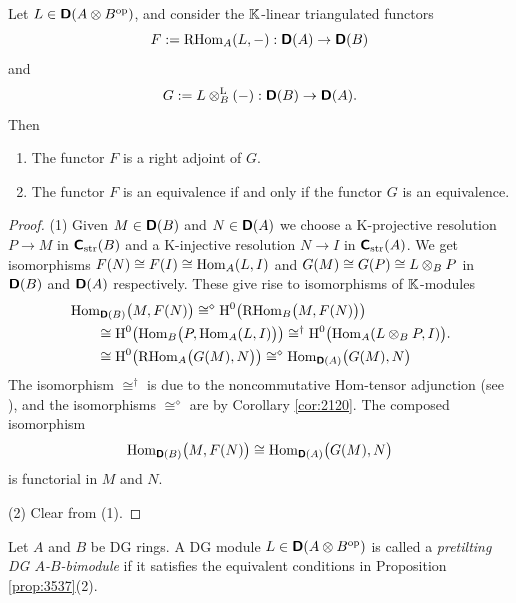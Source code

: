 \begin{prop} \label{prop:3537}
Let $L \in \boldsymbol{\mathsf{D}}(A \otimes B^{\mathrm{op}})$, and consider the $\mathbb{K}$-linear 
triangulated functors
\[ F := \operatorname{RHom}_A(L, -) : \boldsymbol{\mathsf{D}}(A) \to \boldsymbol{\mathsf{D}}(B) \]
and 
\[ G := L \otimes^{\mathrm{L}}_{B} (-) : \boldsymbol{\mathsf{D}}(B) \to \boldsymbol{\mathsf{D}}(A) . \]
Then\tup{:}
\begin{enumerate}
\item The functor $F$ is a right adjoint of $G$.

\item The functor $F$ is an equivalence if and only if the functor $G$ is an 
equivalence. 
\end{enumerate}
\end{prop}

\begin{proof} \mbox{}

\smallskip \noindent
(1) Given $M \in \boldsymbol{\mathsf{D}}(B)$ and $N \in \boldsymbol{\mathsf{D}}(A)$ we choose 
a K-projective resolution $P \to M$ in $\boldsymbol{\mathsf{C}}_{\mathrm{str}}(B)$ and a 
K-injective resolution $N \to I$ in $\boldsymbol{\mathsf{C}}_{\mathrm{str}}(A)$.
We get isomorphisms 
$F(N) \cong F(I) \cong \operatorname{Hom}_A(L, I)$ 
and
$G(M) \cong G(P) \cong L \otimes_B P$ 
in $\boldsymbol{\mathsf{D}}(B)$ and $\boldsymbol{\mathsf{D}}(A)$ respectively.
These give rise to isomorphisms of $\mathbb{K}$-modules
\[ \begin{aligned}
& \operatorname{Hom}_{\boldsymbol{\mathsf{D}}(B)} \bigl( M, F(N) \bigr) \cong^{\diamond}
\operatorname{H}^0 \bigl( \operatorname{RHom}_B \bigl( M, F(N) \bigr) \bigr)
\\
& \qquad \cong
\operatorname{H}^0 \bigl( \operatorname{Hom}_B \bigl( P, \operatorname{Hom}_A(L, I) \bigr) \bigr)
\cong^{\dag}
\operatorname{H}^0 \bigl( \operatorname{Hom}_A(L \otimes_B P, I) \bigr)
\\
& \qquad \cong
\operatorname{H}^0 \bigl( \operatorname{RHom}_A \bigl( G(M), N \bigr) \bigr)
\cong^{\diamond} \operatorname{Hom}_{\boldsymbol{\mathsf{D}}(A)} \bigl( G(M), N \bigr) 
\end{aligned} . \]
The isomorphism $\cong^{\dag}$ is due to the noncommutative Hom-tensor 
adjunction (see \cite[Theorem 2.11]{Rot}), and the 
isomorphisms $\cong^{\diamond}$ are by Corollary \ref{cor:2120}.
The composed isomorphism 
\[ \operatorname{Hom}_{\boldsymbol{\mathsf{D}}(B)} \bigl( M, F(N) \bigr) \cong
\operatorname{Hom}_{\boldsymbol{\mathsf{D}}(A)} \bigl( G(M), N \bigr) \]
is functorial in $M$ and $N$. 

\medskip \noindent 
(2) Clear from (1). 
\end{proof}

\begin{dfn} \label{dfn:3430}
Let $A$ and $B$ be DG rings. A DG module
$L \in \boldsymbol{\mathsf{D}}(A \otimes B^{\mathrm{op}})$
is called a {\em pretilting DG $A$-$B$-bimodule}%
if it satisfies the equivalent 
conditions in Proposition \ref{prop:3537}(2). 
\end{dfn}

